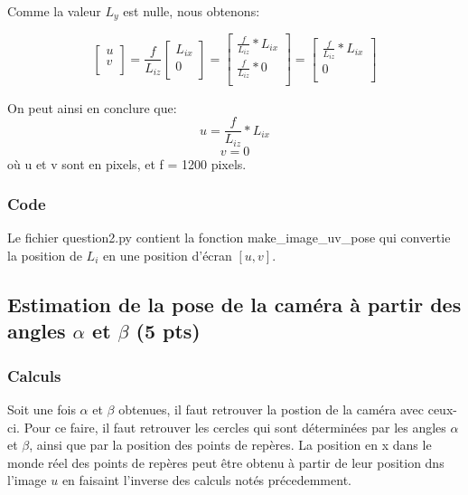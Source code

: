 \documentclass[12pt]{article}
\begin{document}
Comme la valeur $L_y$ est nulle, nous obtenons:


\[ \left[ {\begin{array}{c}
                u \\
    v \\ \end{array} } \right] =
    \frac{f}{L_{iz}}
    \left[ {\begin{array}{c} L_{ix} \\ 0 \\ \end{array}} \right]
=
    \left[ {\begin{array}{c} \frac{f}{L_{iz}} * L_{ix} \\ \frac{f}{L_{iz}} * 0 \\ \end{array}} \right]
=
    \left[ {\begin{array}{c} \frac{f}{L_{iz}} * L_{ix} \\ 0 \\ \end{array}} \right]

\]

On peut ainsi en conclure que:
\[
    u =  \frac{f}{L_{iz}} * L_{ix}
\]
\[
    v = 0
\]
o\`u u et v sont en pixels, et f = 1200 pixels.

\subsubsection{Code}

Le fichier question2.py contient la fonction make\_image\_uv\_pose qui convertie la position de $L_i$ en une position d'écran $ [u, v] $.

\subsection{Estimation de la pose de la caméra à partir des angles $\alpha$ et $\beta$ (5 pts)}

\subsubsection{Calculs}
Soit une fois $\alpha$ et $\beta$ obtenues, il faut retrouver la postion de la cam\'era avec ceux-ci.
Pour ce faire, il faut retrouver les cercles qui sont d\'etermin\'ees par les angles $\alpha$ et $\beta$, ainsi que par la position des points de repères.
La position en x dans le monde r\'eel des points de rep\`eres peut \^etre obtenu \`a partir de leur position dns l'image $u$ en faisaint l'inverse des calculs notés précedemment.
\end{document}
